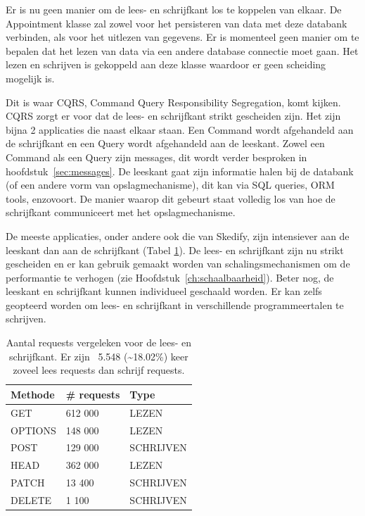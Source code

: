 
Er is nu geen manier om de lees- en schrijfkant los te koppelen van elkaar. De Appointment klasse zal zowel voor het persisteren van data met deze databank verbinden, als voor het uitlezen van gegevens. Er is momenteel geen manier om te bepalen dat het lezen van data via een andere database connectie moet gaan. Het lezen en schrijven is gekoppeld aan deze klasse waardoor er geen scheiding mogelijk is.

Dit is waar \gls{CQRS}, Command Query Responsibility Segregation, komt kijken. \gls{CQRS} zorgt er voor dat de lees- en schrijfkant strikt gescheiden zijn. Het zijn bijna 2 applicaties die naast elkaar staan. Een Command wordt afgehandeld aan de schrijfkant en een Query wordt afgehandeld aan de leeskant. Zowel een Command als een Query zijn messages, dit wordt verder besproken in hoofdstuk~\ref{sec:messages}. De leeskant gaat zijn informatie halen bij de databank (of een andere vorm van opslagmechanisme), dit kan via \gls{SQL} queries, \gls{ORM} tools, enzovoort. De manier waarop dit gebeurt staat volledig los van hoe de schrijfkant communiceert met het opslagmechanisme.

De meeste applicaties, onder andere ook die van Skedify, zijn intensiever aan de leeskant dan aan de schrijfkant (Tabel \ref{cqrs-read-writes}). De lees- en schrijfkant zijn nu strikt gescheiden en er kan gebruik gemaakt worden van schalingsmechanismen om de performantie te verhogen (zie Hoofdstuk~\ref{ch:schaalbaarheid}). Beter nog, de leeskant en schrijfkant kunnen individueel geschaald worden. Er kan zelfs geopteerd worden om lees- en schrijfkant in verschillende programmeertalen te schrijven.

\begin{table}[h]
\centering
\caption[Aantal \glspl{request} vergeleken voor de lees- en schrijfkant.]{Aantal \glspl{request} vergeleken voor de lees- en schrijfkant. Er zijn ~5.548 (\textasciitilde18.02\%) keer zoveel lees \glspl{request} dan schrijf \glspl{request}\footnotemark.}
\begin{tabular}{lll} \toprule
Methode & \# \Glspl{request} & Type        \\ \midrule
GET     & 612 000     & LEZEN       \\
OPTIONS & 148 000     & LEZEN       \\
POST    & 129 000     & SCHRIJVEN   \\
HEAD    & 362 000     & LEZEN       \\
PATCH   & 13 400      & SCHRIJVEN   \\
DELETE  & 1 100       & SCHRIJVEN   \\ \bottomrule
\end{tabular}
\label{cqrs-read-writes}
\end{table}

